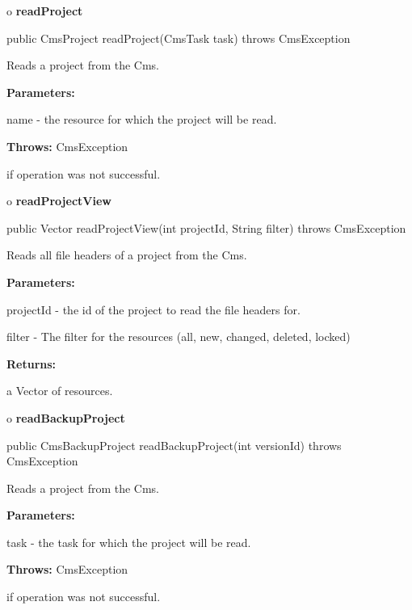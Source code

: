 o {\bf readProject}

\begin{PRE}
 public CmsProject readProject(CmsTask task) throws CmsException
\end{PRE}

\begin{description}
\htmlDD Reads a project from the Cms.

\begin{description}
\item {\bf Parameters:}

name - the resource for which the project will be read.
\item {\bf Throws:} CmsException

if operation was not successful.
\end{description}

\end{description}

o {\bf readProjectView}

\begin{PRE}
 public Vector readProjectView(int projectId,
                               String filter) throws CmsException
\end{PRE}

\begin{description}
\htmlDD Reads all file headers of a project from the Cms.

\begin{description}
\item {\bf Parameters:}

projectId - the id of the project to read the file headers for.

filter - The filter for the resources (all, new, changed, deleted, locked)
\item {\bf Returns:}

a Vector of resources.
\end{description}

\end{description}

o {\bf readBackupProject}

\begin{PRE}
 public CmsBackupProject readBackupProject(int versionId) throws CmsException
\end{PRE}

\begin{description}
\htmlDD Reads a project from the Cms.

\begin{description}
\item {\bf Parameters:}

task - the task for which the project will be read.
\item {\bf Throws:} CmsException

if operation was not successful.
\end{description}

\end{description}

